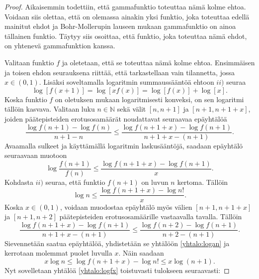 \documentclass[12pt]{article}
\theoremstyle{definition}
\theoremstyle{plain}
\numberwithin{equation}{section}
\begin{document}
\begin{proof}
Aikaisemmin todettiin, että gammafunktio toteuttaa nämä kolme ehtoa. Voidaan siis olettaa, että on olemassa ainakin yksi funktio, joka toteuttaa edellä mainitut ehdot ja  Bohr-Mollerupin lauseen mukaan gammafunktio on ainoa tällainen funktio. Täytyy siis osoittaa, että funktio, joka toteuttaa nämä ehdot, on yhtenevä gammafunktion kanssa.

Valitaan funktio $f$ ja oletetaan, että se toteuttaa nämä kolme ehtoa. Ensimmäisen ja toisen ehdon seurauksena riittää, että tarkastellaan vain tilannetta, jossa $x\in (0,1)$. Lisäksi soveltamalla logaritmin summaussääntöä ehtoon $ii)$ seuraa
\begin{equation} \label{yhtalo:logfx}
    \log [f(x+1)]=\log[xf(x)]=\log [f(x)]+\log[x].
\end{equation}
Koska funktio $f$ on oletuksen mukaan logaritmisesti konveksi, on sen logaritmi tällöin kasvava. Valitaan luku $n\in\mathbb{N}$ sekä välit $[n,n+1]$ ja $[n+1,n+1+x]$, joiden päätepisteiden erotusosamäärät noudattavat seuraavaa epäyhtälöä
\begin{equation*}
    \frac{\log f(n+1)-\log f(n)}{n+1-n}\le\frac{\log f(n+1+x)-\log f(n+1)}{n+1+x-(n+1)}.
\end{equation*}
Avaamalla sulkeet ja käyttämällä logaritmin laskusääntöjä, saadaan epäyhtälö seuraavaan muotoon
\begin{equation*}
    \log \frac{f(n+1)}{f(n)} \le \frac{\log f(n+1+x)-\log f(n+1)}{x}.
\end{equation*}
Kohdasta $ii)$ seuraa, että funktio $f(n+1)$ on luvun $n$ kertoma. Tällöin 
\begin{equation} \label{yhtalo:logan}
    \log n \le \frac{\log f(n+1+x)-\log n!}{x}.
\end{equation}
Koska $x\in(0,1)$, voidaan muodostaa epäyhtälö myös välien $[n+1,n+1+x]$ ja $[n+1, n+2]$ päätepisteiden erotusosamäärille vastaavalla tavalla. Tällöin
\begin{equation*}
    \frac{\log f(n+1+x)-\log f(n+1)}{n+1+x-(n+1)}\le\frac{\log f(n+2)-\log f(n+1)}{n+2-(n+1)}.
\end{equation*}
Sievennetään saatua epäyhtälöä, yhdistetään se yhtälöön \eqref{yhtalo:logan} ja kerrotaan molemmat puolet luvulla $x$. Näin saadaan
\begin{equation} \label{yhtalo:epayhtalo}
    x\log n \le \log f(n+1+x) -\log n! \le x\log (n+1).
\end{equation}
Nyt sovelletaan yhtälöä \eqref{yhtalo:logfx} toistuvasti tulokseen seuraavasti:

\end{proof}
\end{document}
